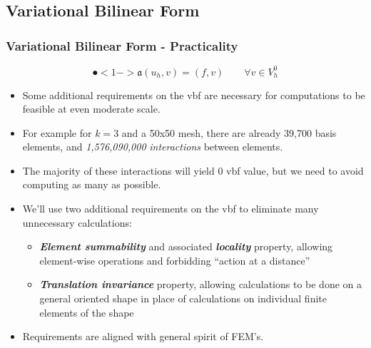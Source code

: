 \documentclass[compress]{beamer}
\begin{document}
\subsection{Variational Bilinear Form}

\begin{frame}
  \frametitle{Variational Bilinear Form - Practicality}
  $$\spot<1->{\mathfrak{a}}(u_h,v) = (f,v)\quad\quad \forall{v} \in V_h^0$$
  \begin{itemize}[<+->]
    \item Some additional requirements on the vbf are necessary for computations to be feasible at even moderate scale.
    \item For example for $k=3$ and a 50x50 mesh, there are already 39,700 basis elements, and \emph{1,576,090,000} 
      \emph{interactions} between elements. 
    \item The majority of these interactions will yield $0$ vbf value, but we need to avoid computing as many as possible.
    \item We'll use two additional requirements on the vbf to eliminate many unnecessary calculations:
        \begin{itemize}[<+->]
          \item \emph{\textbf{Element summability}} and associated \emph{\textbf{locality}} property, allowing element-wise operations and
            forbidding ``action at a distance''
          \item \emph{\textbf{Translation invariance}} property, allowing calculations to be done on a general oriented shape in place of
            calculations on individual finite elements of the shape
        \end{itemize}
    \item Requirements are aligned with general spirit of FEM's.
  \end{itemize}
\end{frame}
\end{document}
